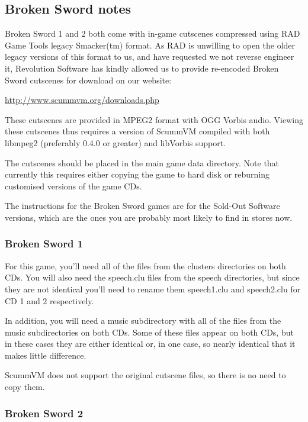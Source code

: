 


\subsection {Broken Sword notes}

Broken Sword 1 and 2 both come with in-game cutscenes compressed using
RAD Game Tools legacy Smacker(tm) format. As RAD is unwilling to open
the older legacy versions of this format to us, and have requested we not
reverse engineer it, Revolution Software has kindly allowed us to provide
re-encoded Broken Sword cutscenes for download on our website:

  \url{http://www.scummvm.org/downloads.php}

These cutscenes are provided in MPEG2 format with OGG Vorbis audio.
Viewing these cutscenes thus requires a version of ScummVM compiled
with both libmpeg2 (preferably 0.4.0 or greater) and libVorbis support.

The cutscenes should be placed in the main game data directory. Note that
currently this requires either copying the game to hard disk or reburning
customised versions of the game CDs.

The instructions for the Broken Sword games are for the Sold-Out Software
versions, which are the ones you are probably most likely to find in stores
now.


\subsubsection{Broken Sword 1}

For this game, you'll need all of the files from the clusters directories on
both CDs. You will also need the speech.clu files from the speech directories,
but since they are not identical you'll need to rename them speech1.clu and
speech2.clu for CD 1 and 2 respectively.

In addition, you will need a music subdirectory with all of the files from the
music subdirectories on both CDs. Some of these files appear on both CDs, but
in these cases they are either identical or, in one case, so nearly identical
that it makes little difference.

ScummVM does not support the original cutscene files, so there is no need to
copy them.


\subsubsection{Broken Sword 2}

